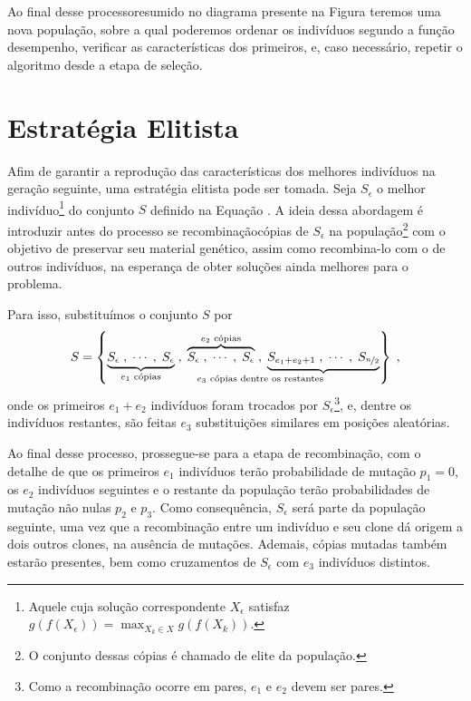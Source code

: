 Ao final desse processo\trav resumido no diagrama presente na Figura \trav
teremos uma nova população, sobre a qual poderemos ordenar os indivíduos segundo a função desempenho, verificar
as características dos primeiros, e, caso necessário, repetir o algoritmo desde a etapa de seleção.

\section{Estratégia Elitista}

Afim de garantir a reprodução das características dos melhores indivíduos na geração seguinte, uma
estratégia elitista pode ser tomada\cite{goldberg1989ga}\cite{roncaratti2006ga}.
Seja $S_{\epsilon}$ o melhor indivíduo\footnote{
  Aquele cuja solução correspondente $X_{\epsilon}$ satisfaz $ g(f(X_{\epsilon})) = \max_{X_k \in X} g(f(X_k)) $.
}
do conjunto $S$ definido na Equação . A ideia dessa abordagem é introduzir\trav
antes do processo se recombinação\trav cópias de $S_{\epsilon}$ na população\footnote{
  O conjunto dessas cópias é chamado de elite da população.
}
com o objetivo de preservar seu material genético, assim como recombina-lo com o de outros indivíduos, na esperança
de obter soluções ainda melhores para o problema.

Para isso, substituímos o conjunto $S$ por
\begin{equation}
  S =
  \left\{
  \underbrace{S_{\epsilon}\;, \mathdots,  \;S_{\epsilon}}_{e_1 \text{ cópias}}\;,\;
  \overbrace{S_{\epsilon}\;, \mathdots,  \;S_{\epsilon}}^{e_2 \text{ cópias}}\;,\;
  \underbrace{S_{e_1 + e_2 + 1}\;, \mathdots,  \;S_{\nicefrac{n}{2}}}_{\mathllap{e_3 \text{ cópias dentre os restantes}}}
  \right\}
  \mathcomma
\end{equation}
onde os primeiros $e_1 + e_2$ indivíduos foram trocados por $S_{\epsilon}$\footnote{
  Como a recombinação ocorre em pares, $e_1$ e $e_2$ devem ser pares.
}, e, dentre os indivíduos restantes,
são feitas $e_3$ substituições similares em posições aleatórias.

Ao final desse processo, prossegue-se para a etapa de recombinação, com o detalhe de que os primeiros $e_1$
indivíduos terão probabilidade de mutação $p_1 = 0$, os $e_2$ indivíduos seguintes e o restante da população
terão probabilidades de mutação não nulas $p_2$ e $p_3$.
Como consequência, $S_{\epsilon}$ será parte da população seguinte, uma vez que a recombinação entre um
indivíduo e seu clone dá origem a dois outros clones, na ausência de mutações. Ademais, cópias mutadas
também estarão presentes, bem como cruzamentos de $S_{\epsilon}$ com $e_3$ indivíduos distintos.
